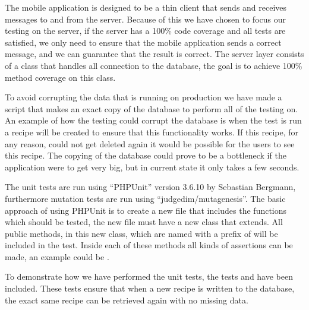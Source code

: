 The mobile application is designed to be a thin client that sends and receives messages to and from the server. Because of this we have chosen to focus our testing on the server, if the server has a 100\% code coverage and all tests are satisfied, we only need to ensure that the mobile application sends a correct message, and we can guarantee that the result is correct.
The server layer consists of a class that handles all connection to the database, the goal is to achieve 100\% method coverage on this class.

To avoid corrupting the data that is running on production we have made a script that makes an exact copy of the database to perform all of the testing on. An example of how the testing could corrupt the database is when the test is run a recipe will be created to ensure that this functionality works. If this recipe, for any reason, could not get deleted again it would be possible for the users to see this recipe. The copying of the database could prove to be a bottleneck if the application were to get very big, but in current state it only takes a few seconds.

The unit tests are run using ``PHPUnit'' version 3.6.10 by Sebastian Bergmann\cite{phpunit}, furthermore mutation tests are run using ``judgedim/mutagenesis''\cite{mutagenesis}. The basic approach of using PHPUnit is to create a new file that includes the functions which should be tested, the new file must have a new class that extends\linebreak {}. All public methods, in this new class, which are named with a prefix of  will be included in the test. Inside each of these methods all kinds of assertions can be made, an example could be .

To demonstrate how we have performed the unit tests, the tests  and  have been included. These tests ensure that when a new recipe is written to the database, the exact same recipe can be retrieved again with no missing data.

